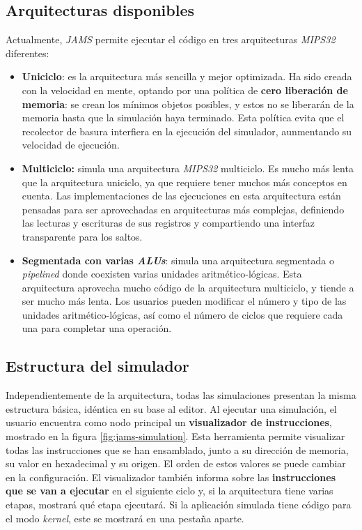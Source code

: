 \subsection{Arquitecturas disponibles}\label{subsec:arquitecturas-disponibles}

Actualmente, \textit{JAMS} permite ejecutar el código
en tres arquitecturas \textit{MIPS32} diferentes:
\begin{itemize}
    \item \textbf{Uniciclo}: es la arquitectura más sencilla y
    mejor optimizada.
    Ha sido creada con la velocidad en mente, optando por una
    política de \textbf{cero liberación de memoria}: se crean los mínimos
    objetos posibles, y estos no se liberarán de la memoria hasta que
    la simulación haya terminado.
    Esta política evita que el recolector de basura interfiera en la
    ejecución del simulador, aunmentando su velocidad de ejecución.
    \item \textbf{Multiciclo:} simula una arquitectura
    \textit{MIPS32} multiciclo.
    Es mucho más lenta que la arquitectura uniciclo, ya que requiere
    tener muchos más conceptos en cuenta.
    Las implementaciones de las ejecuciones en esta arquitectura
    están pensadas para ser aprovechadas en arquitecturas más
    complejas, definiendo las lecturas y escrituras de sus
    registros y compartiendo una interfaz transparente para los saltos.
    \item \textbf{Segmentada con varias \textit{ALUs}}: simula
    una arquitectura segmentada o \textit{pipelined} donde coexisten varias
    unidades aritmético-lógicas.
    Esta arquitectura aprovecha mucho código de la arquitectura
    multiciclo, y tiende a ser mucho más lenta.
    Los usuarios pueden modificar el número y tipo de las unidades
    aritmético-lógicas, así como el número de ciclos que requiere
    cada una para completar una operación.
\end{itemize}

\subsection{Estructura del simulador}\label{subsec:estructura-del-simulador}

Independientemente de la arquitectura, todas las simulaciones presentan
la misma estructura básica, idéntica en su base al editor.
Al ejecutar una simulación, el usuario encuentra como nodo principal
un \textbf{visualizador de instrucciones}, mostrado en la figura \ref{fig:jams-simulation}.
Esta herramienta permite visualizar todas las instrucciones que se han
ensamblado, junto a su dirección de memoria, su valor en hexadecimal y
su origen.
El orden de estos valores se puede cambiar en la configuración.
El visualizador también informa sobre las \textbf{instrucciones que se van
a ejecutar} en el siguiente ciclo y, si la arquitectura tiene varias
etapas, mostrará qué etapa ejecutará.
Si la aplicación simulada tiene código para el modo \textit{kernel},
este se mostrará en una pestaña aparte.


